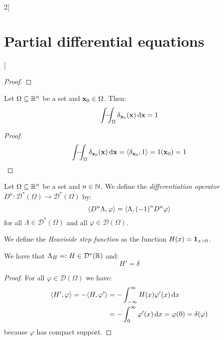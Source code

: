 \documentclass[../../../main_math.tex]{subfiles}
\begin{document}
\begin{multicols}{2}[\section{Partial differential equations}]
\begin{proof}
  \end{proof}
  \begin{proposition}
    Let $\Omega\subseteq \mathbb{R}^n$ be a set and $\boldsymbol{\mathrm{x}}_0\in\Omega$. Then: $$\idotsint_\Omega \delta_{\boldsymbol{\mathrm{x}}_0}(\boldsymbol{\mathrm{x}})\dd{\boldsymbol{\mathrm{x}}}=1$$
  \end{proposition}
  \begin{proof}
    $$\idotsint_\Omega \delta_{\boldsymbol{\mathrm{x}}_0}(\boldsymbol{\mathrm{x}})\dd{\boldsymbol{\mathrm{x}}}={\left\langle\delta_{\boldsymbol{\mathrm{x}}_0},1\right\rangle}=1(\boldsymbol{\mathrm{x}}_0)=1$$
  \end{proof}
  \begin{definition}
    Let $\Omega\subseteq \mathbb{R}^n$ be a set and $n\in\mathbb{N}$. We define the \emph{differentiation operator} $D^n:\mathcal{D}^*(\Omega)\rightarrow\mathcal{D}^*(\Omega)$ by: $${\left\langle D^n\Lambda,\varphi\right\rangle}={\left\langle\Lambda,{(-1)}^nD^n\varphi\right\rangle}$$
    for all $\Lambda\in\mathcal{D}^*(\Omega)$ and all $\varphi\in\mathcal{D}(\Omega)$.
  \end{definition}
  \begin{definition}
    We define the \emph{Heaviside step function} as the function $H(x)=\boldsymbol{\mathrm{1}}_{x>0}$.
  \end{definition}
  \begin{proposition}
    We have that $\Lambda_{H}=:H\in\mathcal{D}^*(\mathbb{R})$ and: $$H'=\delta$$
  \end{proposition}
  \begin{proof}
    For all $\varphi\in\mathcal{D}(\Omega)$ we have:
    \begin{align*}
      {\left\langle H',\varphi\right\rangle}=-{\left\langle H,\varphi'\right\rangle} & =-\int_{-\infty}^\infty H(x)\varphi'(x)\dd{x}                  \\
                                             & =-\int_{0}^\infty\varphi'(x)\dd{x}= \varphi(0)=\delta(\varphi)
    \end{align*}
    because $\varphi$ has compact support.
  \end{proof}

\end{multicols}
\end{document}
